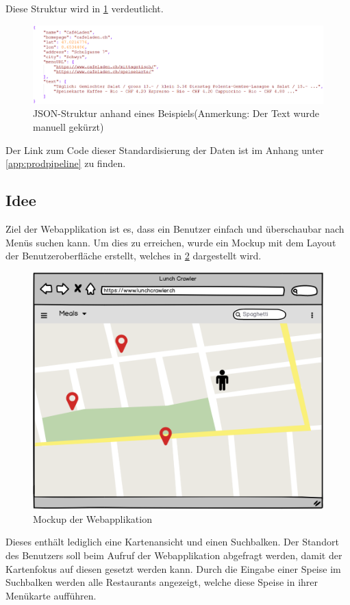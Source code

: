 Diese Struktur wird in \cref{fig:json_struktur} verdeutlicht.
\begin{figure}[H]
	\includegraphics[width=1\columnwidth,keepaspectratio]{img/json_struktur.png}
	\caption{JSON-Struktur anhand eines Beispiels(Anmerkung: Der Text wurde manuell gekürzt)}
	\label{fig:json_struktur}
\end{figure}
Der Link zum Code dieser Standardisierung der Daten ist im Anhang unter \cref{app:prodpipeline} zu finden.
\FloatBarrier
\subsection{Idee}
Ziel der Webapplikation ist es, dass ein Benutzer einfach und überschaubar nach Menüs suchen kann.
Um dies zu erreichen, wurde ein Mockup mit dem Layout der Benutzeroberfläche erstellt, welches in \cref{fig:webapp_mockup} dargestellt wird.
\begin{figure}[H]
	\centering
	\includegraphics[width=0.7\columnwidth,keepaspectratio]{img/webapp_mockup.png}
	\caption{Mockup der Webapplikation}
	\label{fig:webapp_mockup}
\end{figure}
Dieses enthält lediglich eine Kartenansicht und einen Suchbalken.
Der Standort des Benutzers soll beim Aufruf der Webapplikation abgefragt werden, damit der Kartenfokus auf diesen gesetzt werden kann.
Durch die Eingabe einer Speise im Suchbalken werden alle Restaurants angezeigt, welche diese Speise in ihrer Menükarte aufführen.
